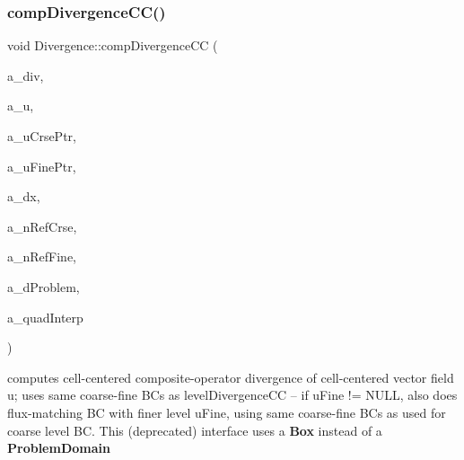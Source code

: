 \subsubsection{\texorpdfstring{comp\+Divergence\+C\+C()}{compDivergenceCC()}\hspace{0.1cm}{\footnotesize\ttfamily [2/4]}}
{\footnotesize\ttfamily void Divergence\+::comp\+Divergence\+CC (\begin{DoxyParamCaption}\item[{\textbf{ Level\+Data}$<$ \textbf{ F\+Array\+Box} $>$ \&}]{a\+\_\+div,  }\item[{\textbf{ Level\+Data}$<$ \textbf{ F\+Array\+Box} $>$ \&}]{a\+\_\+u,  }\item[{\textbf{ Level\+Data}$<$ \textbf{ F\+Array\+Box} $>$ $\ast$}]{a\+\_\+u\+Crse\+Ptr,  }\item[{\textbf{ Level\+Data}$<$ \textbf{ F\+Array\+Box} $>$ $\ast$}]{a\+\_\+u\+Fine\+Ptr,  }\item[{const \textbf{ Real}}]{a\+\_\+dx,  }\item[{const int}]{a\+\_\+n\+Ref\+Crse,  }\item[{const int}]{a\+\_\+n\+Ref\+Fine,  }\item[{const \textbf{ Box} \&}]{a\+\_\+d\+Problem,  }\item[{const bool}]{a\+\_\+quad\+Interp }\end{DoxyParamCaption})\hspace{0.3cm}{\ttfamily [static]}}

computes cell-\/centered composite-\/operator divergence of cell-\/centered vector field u; uses same coarse-\/fine BC\textquotesingle{}s as level\+Divergence\+CC -- if u\+Fine != N\+U\+LL, also does flux-\/matching BC with finer level u\+Fine, using same coarse-\/fine BC\textquotesingle{}s as used for coarse level BC. This (deprecated) interface uses a \textbf{ Box} instead of a \textbf{ Problem\+Domain} \mbox{\label{class_divergence_a4bafaf6a0fee4270b05bfb1b31c915ed}} 

